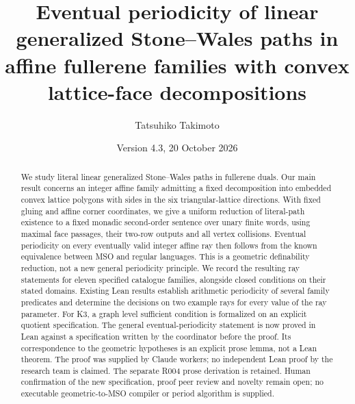 \documentclass[11pt]{amsart}
\title[Affine fullerene families and eventual periodicity]{Eventual periodicity of linear generalized Stone--Wales paths in affine fullerene families with convex lattice-face decompositions}
\author{Tatsuhiko Takimoto}
\date{Version 4.3, 20 October 2026}
\theoremstyle{definition}\newtheorem{definition}{Definition}
\begin{document}
\begin{abstract}
We study literal linear generalized Stone--Wales paths in fullerene
duals. Our main result concerns an integer affine family admitting a
fixed decomposition into embedded convex lattice polygons with sides
in the six triangular-lattice directions. With fixed gluing and affine
corner coordinates, we give a uniform reduction of literal-path
existence to a fixed monadic second-order sentence over unary finite
words, using maximal face passages, their two-row outputs and all
vertex collisions. Eventual periodicity on every eventually valid
integer affine ray then follows from the known equivalence between
MSO and regular languages. This is a geometric definability reduction,
not a new general periodicity principle. We record
the resulting ray statements for eleven specified catalogue families,
alongside closed conditions on their stated domains. Existing Lean
results establish arithmetic periodicity of several family predicates
and determine the decisions on two example rays for every value of the ray parameter. For K3, a graph
level sufficient condition is formalized on an explicit quotient
specification. The general eventual-periodicity statement is now proved
in Lean against a specification written by the coordinator before the
proof. Its correspondence to the geometric hypotheses is an explicit
prose lemma, not a Lean theorem. The proof was supplied by Claude
workers; no independent Lean proof by the research team is claimed.
The separate R004 prose derivation is retained. Human confirmation of
the new specification, proof peer review and novelty remain open;
no executable geometric-to-MSO compiler or period algorithm is supplied.
\end{abstract}
\maketitle
\end{document}
